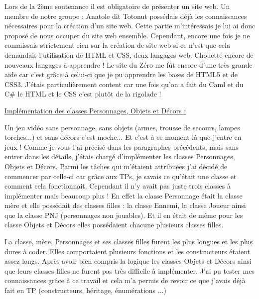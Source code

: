 \documentclass{article}
\begin{document}
\par
Lors de la 2ème soutenance il est obligatoire de présenter un site web. Un membre de notre groupe : Anatole dit Totonut possédais déjà les connaissances nécessaires pour la création d'un site web. Cette partie m'intéressais je lui ai donc proposé de nous occuper du site web ensemble. Cependant, encore une fois je ne connaissais strictement rien sur la création de site web si ce n'est que cela demandais l'utilisation de HTML et CSS, deux langages web. Chouette encore de nouveaux langages à apprendre ! Le site du Zéro me fût encore d'une très grande aide car c'est grâce à celui-ci que je pu apprendre les bases de HTML5 et de CSS3. J'étais particulièrement content car une fois qu'on a fait du Caml et du C\# le HTML et le CSS c'est plutôt de la rigolade !
\newline

\par
\underline{Implémentation des classes Personnages, Objets et Décors :}
\newline

\par
Un jeu vidéo sans personnage, sans objets (armes, trousse de secours, lampes torches...) et sans décors c'est moche... Et c'est à ce moment-là que j'entre en jeux ! Comme je vous l'ai précisé dans les paragraphes précédents, mais sans entrer dans les détails, j'étais chargé d'implémenter les classes Personnages, Objets et Décors. Parmi les tâches qui m'étaient attribuées j'ai décidé de commencer par celle-ci car grâce aux TPs, je savais ce qu'était une classe et comment cela fonctionnait. Cependant il n'y avait pas juste trois classes à implémenter mais beaucoup plus ! En effet la classe Personnage était la classe mère et elle possédait des classes filles : la classe Ennemi, la classe Joueur ainsi que la classe PNJ (personnages non jouables). Et il en était de même pour les classe Objets et Décors elles possédaient chacune plusieurs classes filles.
\newline

\par
La classe, mère, Personnages et ses classes filles furent les plus longues et les plus dures à coder. Elles comportaient plusieurs fonctions et les constructeurs étaient assez longs. Après avoir bien compris la logique les classes Objets et Décors ainsi que leurs classes filles ne furent pas très difficile à implémenter. J'ai pu tester mes connaissances grâce à ce travail et cela m'a permis de revoir ce que j'avais déjà fait en TP (constructeurs, héritage, énumérations ...) 
\newline
\end{document}
